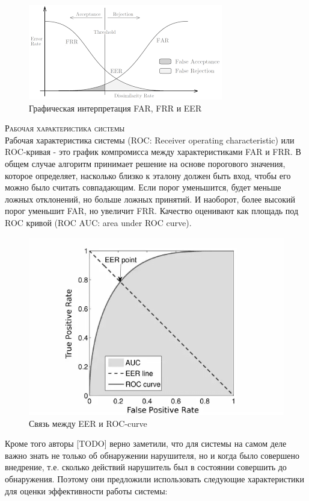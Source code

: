 \documentclass[12pt]{article}
\begin{document}
    \begin{figure}[h]
        \centering
        \includegraphics{EER.png}
        \caption{Графическая интерпретация FAR, FRR и EER}
        \label{sec:Overview:Metrics:fig:EER}
    \end{figure}
    \vspace{10mm}

    \noident\textsc{Рабочая характеристика системы} \\
    \noident Рабочая характеристика системы (ROC: Receiver operating characteristic) или ROC-кривая - это график компромисса между характеристиками FAR и FRR. В общем случае алгоритм принимает решение на основе порогового значения, которое определяет, насколько близко к эталону должен быть вход, чтобы его можно было считать совпадающим. Если порог уменьшится, будет меньше ложных отклонений, но больше ложных принятий. И наоборот, более высокий порог уменьшит FAR, но увеличит FRR. Качество оценивают как площадь под ROC кривой (ROC AUC: area under ROC curve).

    \begin{figure}[hb]
        \centering
        \includegraphics[width=0.75\linewidth]{EER_ROC.png}
        \caption{Связь между EER и ROC-curve}
        \label{sec:Overview:Metrics:fig:EER}
    \end{figure}

    Кроме того авторы [TODO] верно заметили, что для системы на самом деле важно знать не только об обнаружении нарушителя, но и когда было совершено внедрение, т.е. сколько действий нарушитель был в состоянии совершить до обнаружения. Поэтому они предложили использовать следующие характеристики для оценки эффективности работы системы: \\
\end{document}
